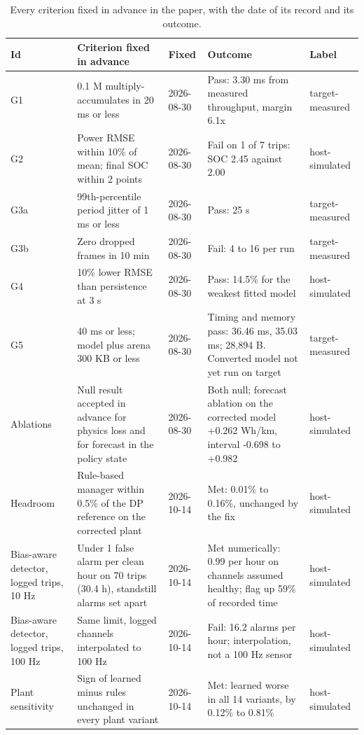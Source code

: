 \documentclass{ieeeaccess}
\begin{document}
\begin{table}[!t]
\centering
\caption{Every criterion fixed in advance in the paper, with the date of its record and its outcome.}
\label{tab:platform-gates}
\footnotesize
\setlength{\tabcolsep}{3pt}
\renewcommand{\arraystretch}{1.15}
\begin{tabularx}{\textwidth}{@{}XXXXX@{}}
\hline
\textbf{Id} & \textbf{Criterion fixed in advance} & \textbf{Fixed} & \textbf{Outcome} & \textbf{Label} \\
\hline
G1 & 0.1 M multiply-accumulates in 20 ms or less & 2026-08-30 & Pass: 3.30 ms from measured throughput, margin 6.1x & target-measured \\
G2 & Power RMSE within 10\% of mean; final SOC within 2 points & 2026-08-30 & Fail on 1 of 7 trips: SOC 2.45 against 2.00 & host-simulated \\
G3a & 99th-percentile period jitter of 1 ms or less & 2026-08-30 & Pass: 25 \textmu{}s & target-measured \\
G3b & Zero dropped frames in 10 min & 2026-08-30 & Fail: 4 to 16 per run & target-measured \\
G4 & 10\% lower RMSE than persistence at 3 s & 2026-08-30 & Pass: 14.5\% for the weakest fitted model & host-simulated \\
G5 & 40 ms or less; model plus arena 300 KB or less & 2026-08-30 & Timing and memory pass: 36.46 ms, 35.03 ms; 28,894 B. Converted model not yet run on target & target-measured \\
Ablations & Null result accepted in advance for physics loss and for forecast in the policy state & 2026-08-30 & Both null; forecast ablation on the corrected model +0.262 Wh/km, interval -0.698 to +0.982 & host-simulated \\
Headroom & Rule-based manager within 0.5\% of the DP reference on the corrected plant & 2026-10-14 & Met: 0.01\% to 0.16\%, unchanged by the fix & host-simulated \\
Bias-aware detector, logged trips, 10 Hz & Under 1 false alarm per clean hour on 70 trips (30.4 h), standstill alarms set apart & 2026-10-14 & Met numerically: 0.99 per hour on channels assumed healthy; flag up 59\% of recorded time & host-simulated \\
Bias-aware detector, logged trips, 100 Hz & Same limit, logged channels interpolated to 100 Hz & 2026-10-14 & Fail: 16.2 alarms per hour; interpolation, not a 100 Hz sensor & host-simulated \\
Plant sensitivity & Sign of learned minus rules unchanged in every plant variant & 2026-10-14 & Met: learned worse in all 14 variants, by 0.12\% to 0.81\% & host-simulated \\

\end{tabularx}
\end{table}
\end{document}
